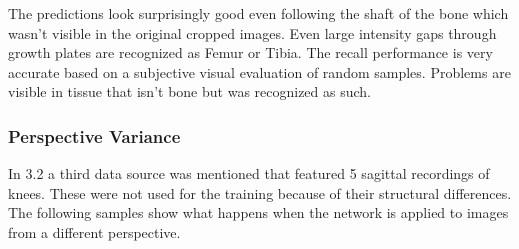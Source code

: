 The predictions look surprisingly good even following the shaft of the bone which wasn't visible in the original cropped images. Even large intensity gaps through growth plates are recognized as Femur or Tibia. The recall performance is very accurate based on a subjective visual evaluation of random samples. Problems are visible in tissue that isn't bone but was recognized as such.

\subsubsection{Perspective Variance}

In 3.2 a third data source was mentioned that featured 5 sagittal recordings of knees. These were not used for the training because of their structural differences. The following samples show what happens when the network is applied to images from a different perspective.

